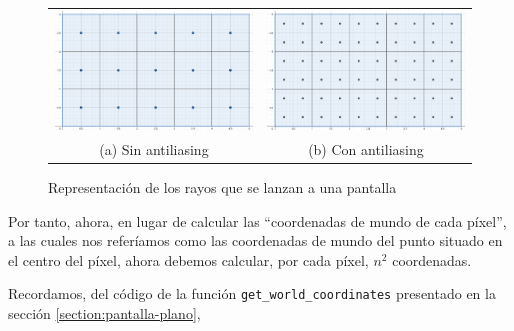 \begin{figure}[ht]
    \centering
    \begin{tabular}{cc}
        \includegraphics[scale=0.20]{img/C6/pixeles-sin-antiliasing.png} &
      \includegraphics[scale=0.20]{img/C6/pixeles-con-antiliasing.png} \\    
    (a) Sin antiliasing & (b) Con antiliasing  \\
    \end{tabular}
    \caption{Representación de los rayos que se lanzan a una pantalla}
    \label{fig:pantalla-antiliasing}
\end{figure}

Por tanto, ahora, en lugar de calcular las ``coordenadas de mundo de cada píxel'', a las cuales nos referíamos como las coordenadas de mundo del punto situado en el centro del píxel, ahora debemos calcular, por cada píxel, $n^2$ coordenadas. 

Recordamos, del código de la función \verb|get_world_coordinates| presentado en la sección \ref{section:pantalla-plano}, 

